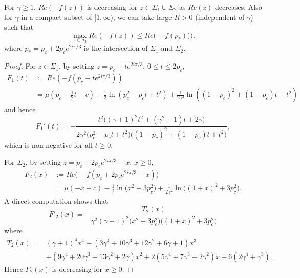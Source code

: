 \documentclass[11pt]{article}
\begin{document}
\begin{lemma}\label{lem:Refminus}
  For $\gamma\ge 1$, $Re(-f(z))$ is decreasing for
$z\in\Sigma_1\cup\Sigma_2$ as $Re(z)$ decreases. Also for $\gamma$
in a compact subset of $[1,\infty)$, we can take large $R>0$
(independent of $\gamma$) such that
\begin{equation}
  \max_{z\in\sigma_3} Re(-f(z)) \le Re
\bigl(-f(p_*))\bigr).
\end{equation}
where $p_*=p_c+2p_ce^{2i\pi/3}$ is the intersection
of $\Sigma_1$ and $\Sigma_2$.
\end{lemma}

\begin{proof}
For $z\in \Sigma_1$, by setting $z=p_c+t e^{2i\pi/3}$, $0\le t\le 2p_c$,
\begin{equation}
\begin{split}
  F_1(t)& := Re (-f(p_c+t e^{2i\pi/3}))  \\
  & = \mu(p_c-\frac12 t -c) - \frac12 \ln (p_c^2-p_c t+t^2)
  + \frac1{2\gamma^2} \ln ((1-p_c)^2+(1-p_c)t +t^2)
\end{split}
\end{equation}
and hence
\begin{equation}
  F_1'(t) = -\frac{t^2\bigl( (\gamma+1)^2t^2+(\gamma^2-1)t+2\gamma \bigr)}
  {2\gamma^2\bigl(p_c^2-p_ct+t^2\bigr)
  \bigl((1-p_c)^2+(1-p_c)t+t^2\bigr)},
\end{equation}
which is non-negative for all $t \ge 0$.


For $\Sigma_2$, by setting $z= p_c+2p_c e^{2i\pi/3} - x$, $x\ge 0$,
\begin{equation}
\begin{split}
  F_2(x) &:= Re\bigl(- f (p_c+2p_c e^{2i\pi/3} - x)\bigr) \\
  &= \mu(-x-c) - \frac12 \ln \bigl( x^2+3p_c^2\bigr)
  + \frac1{2\gamma^2} \ln\bigl( (1+x)^2+3p_c^2\bigr).
\end{split}
\end{equation}
A direct computation shows that
\begin{equation}
  F'_2(x) = -\frac{T_2(x)}{\gamma^2(\gamma+1)^2 \bigl( x^2+3p_c^2\bigr)
  \bigl( (1+x)^2+3p_c^2\bigr)}
\end{equation}
where
\begin{equation}
\begin{split}
  T_2(x) =& (\gamma+1)^4x^4 +
  (3\gamma^4+10\gamma^3+12\gamma^2+6\gamma+1)x^3 \\
  & + (9\gamma^4+20\gamma^3+13\gamma^2+2\gamma)x^2
  + 2(5\gamma^4+7\gamma^3+2\gamma^2)x + 6(2\gamma^4+\gamma^3).
\end{split}
\end{equation}
Hence $F_2(x)$ is decreasing for $x\ge 0$.


\end{proof}
\end{document}
